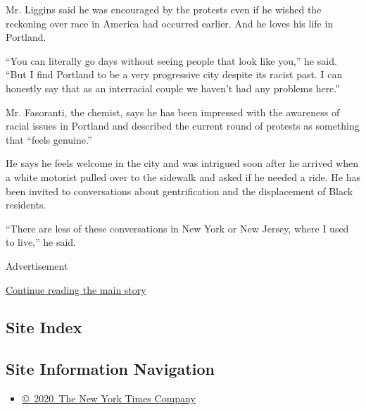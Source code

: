 Mr. Liggins said he was encouraged by the protests even if he wished the
reckoning over race in America had occurred earlier. And he loves his
life in Portland.

``You can literally go days without seeing people that look like you,''
he said. ``But I find Portland to be a very progressive city despite its
racist past. I can honestly say that as an interracial couple we haven't
had any problems here.''

Mr. Fasoranti, the chemist, says he has been impressed with the
awareness of racial issues in Portland and described the current round
of protests as something that ``feels genuine.''

He says he feels welcome in the city and was intrigued soon after he
arrived when a white motorist pulled over to the sidewalk and asked if
he needed a ride. He has been invited to conversations about
gentrification and the displacement of Black residents.

``There are less of these conversations in New York or New Jersey, where
I used to live,'' he said.

Advertisement

\protect\hyperlink{after-bottom}{Continue reading the main story}

\hypertarget{site-index}{%
\subsection{Site Index}\label{site-index}}

\hypertarget{site-information-navigation}{%
\subsection{Site Information
Navigation}\label{site-information-navigation}}

\begin{itemize}
\tightlist
\item
  \href{https://help.nytimes.com/hc/en-us/articles/115014792127-Copyright-notice}{©~2020~The
  New York Times Company}
\end{itemize}

